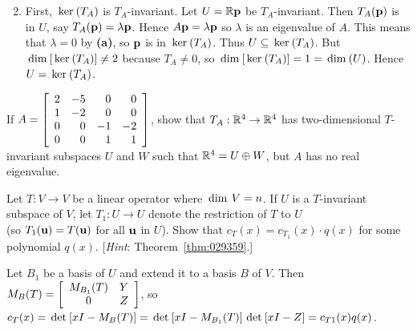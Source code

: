 \begin{multicols}{2}
\begin{ex}
\begin{enumerate}[label={\alph*.}]
\end{enumerate}
\begin{sol}
\begin{enumerate}[label={\alph*.}]
\setcounter{enumi}{1}
\item First, $\thinspace\operatorname{ker\medspace}(T_{A})$ is $T_{A}$-invariant. Let $U = \mathbb{R}\textbf{p}$ be $T_{A}$-invariant. Then $T_{A}(\textbf{p})$ is in $U$, say $T_{A}(\textbf{p}) = \lambda\textbf{p}$. Hence $A\textbf{p} = \lambda\textbf{p}$ so $\lambda$ is an eigenvalue of $A$. This means that $\lambda = 0$ by \textbf{(a)}, so $\textbf{p}$ is in $\thinspace\operatorname{ker\medspace}(T_{A})$. Thus $U \subseteq \thinspace\operatorname{ker\medspace}(T_{A})$. But $\thinspace\operatorname{dim\medspace}[\thinspace\operatorname{ker\medspace}(T_{A})] \neq 2$ because $T_{A} \neq 0$, so $\thinspace\operatorname{dim\medspace}[\thinspace\operatorname{ker\medspace}(T_{A})] = 1 = \thinspace\operatorname{dim\medspace}(U)$. Hence $U = \thinspace\operatorname{ker\medspace}(T_{A})$.
\end{enumerate}
\end{sol}
\end{ex}

\begin{ex}
If $A = \left[ \begin{array}{rrrr}
2 & -5 & 0 & 0 \\
1 & -2 & 0 & 0 \\
0 & 0 & -1 & -2 \\
0 & 0 & 1 & 1
\end{array} \right]$, show that $T_{A} : \mathbb{R}^4 \to \mathbb{R}^4$ has two-dimensional $T$-invariant subspaces $U$ and $W$ such that $\mathbb{R}^4 = U \oplus W$, but $A$ has no real eigenvalue.
\end{ex}

\columnbreak

\begin{ex}
Let $T : V \to V$ be a linear operator where $\thinspace\operatorname{dim \medspace}V = n$. If $U$ is a $T$-invariant subspace of $V$, let $T_{1} : U \to U$ denote the restriction of $T$ to $U$ \\ (so $T_{1}(\textbf{u}) = T(\textbf{u})$ for all $\textbf{u}$ in $U$). Show that $c_T(x) = c_{T_1}(x) \cdot q(x)$ for some polynomial $q(x)$. [\textit{Hint}: Theorem~\ref{thm:029359}.]

\begin{sol}
Let $B_{1}$ be a basis of $U$ and extend it to a basis $B$ of $V$. Then $M_B(T) = \left[ \begin{array}{cc} M_{B_1}(T) & Y \\ 0 & Z \end{array} \right]$, so $c_T(x) = \thinspace\operatorname{det \medspace} [xI - M_B(T)] = \thinspace\operatorname{det \medspace} [xI - M_{B_1}(T)]\thinspace\operatorname{det \medspace} [xI - Z] = c_{T1}(x)q(x)$.
\end{sol}
\end{ex}


\end{multicols}
